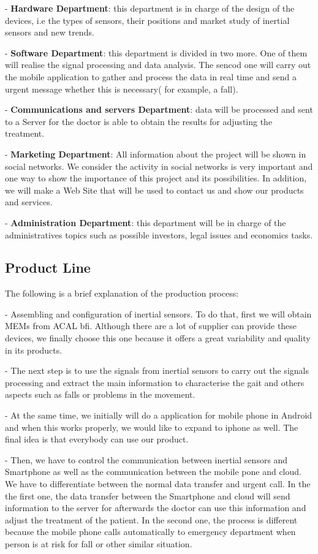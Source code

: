 -	\textbf{Hardware Department}: this department is in charge of the design of the devices, i.e the types of sensors, their  positions  and market study of inertial sensors and new trends.

-	\textbf{Software Department}: this department is divided in two more. One of them will realise the signal processing and data analysis. The sencod one will carry out the mobile application to gather and process the data in real time and send a urgent message whether this is necessary( for example, a fall).

-	\textbf{Communications and servers Department}: data will be processed and sent to a Server for the doctor is able to obtain the results for adjusting the treatment.

-	\textbf{Marketing Department}: All information about the project will be shown in  social networks. We consider the activity in social networks is very important and one way to show the importance of this project and its possibilities.
In addition, we will make a Web Site that will be used to contact us and show our products and services.

-	\textbf{Administration Department}: this department will be in charge of the administratives topics such as possible investors, legal issues and economics tasks.


\subsection{Product Line}
The following is a brief explanation of the production process:

-	Assembling and configuration of inertial sensors. To do that, first we will obtain MEMs from ACAL bfi. Although there are a lot of supplier can provide these devices, we finally choose this one because it offers a great variability and quality in its products.

-	The next step is to use the signals from inertial sensors to carry out the signals processing and extract the main information to characterise the gait and others aspects such as falls or problems in the movement.

-	At the same time, we initially will do a application for mobile phone in Android and when this works properly, we would like to expand to iphone as well. The final idea is that everybody can use our product.

-	Then, we have to control the communication between inertial sensors and Smartphone as well as the communication between the mobile pone and cloud. We have to differentiate between the normal data transfer and urgent call. In the the first one, the data transfer between the Smartphone and cloud will send information to the server for afterwards the doctor can use this information and adjust the treatment of the patient. In the second one, the process is different because the mobile phone calls automatically to emergency department when person is at risk for fall or other similar situation.

